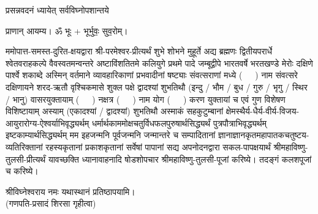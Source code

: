 
\setlength{\parindent}{0pt}




{प्रसन्नवदनं ध्यायेत् सर्वविघ्नोपशान्तये}
 
प्राणान्  आयम्य।  ॐ भूः + भूर्भुवः॒ सुव॒रोम्।


ममोपात्त-समस्त-दुरित-क्षयद्वारा श्री-परमेश्वर-प्रीत्यर्थं शुभे शोभने मुहूर्ते अद्य ब्रह्मणः
द्वितीयपरार्धे श्वेतवराहकल्पे वैवस्वतमन्वन्तरे अष्टाविंशतितमे कलियुगे प्रथमे पादे
जम्बूद्वीपे भारतवर्षे भरतखण्डे मेरोः दक्षिणे पार्श्वे शकाब्दे अस्मिन् वर्तमाने व्यावहारिकाणां प्रभवादीनां षष्ट्याः संवत्सराणां मध्ये \mbox{(~~~)} नाम संवत्सरे दक्षिणायने
शरद-ऋतौ  वृश्चिकमासे शुक्ल पक्षे द्वादश्यां शुभतिथौ
(इन्दु / भौम / बुध / गुरु / भृगु / स्थिर / भानु) वासरयुक्तायाम्
\mbox{(~~~)} नक्षत्र \mbox{(~~~)} नाम  योग  \mbox{(~~~)} करण युक्तायां च एवं गुण विशेषण विशिष्टायाम्
अस्याम् (एकादश्यां / द्वादश्यां) शुभतिथौ
अस्माकं सहकुटुम्बानां क्षेमस्थैर्य-धैर्य-वीर्य-विजय-आयुरारोग्य-ऐश्वर्याभिवृद्ध्यर्थम्
 धर्मार्थकाममोक्ष\-चतुर्विधफलपुरुषार्थसिद्ध्यर्थं पुत्रपौत्राभि\-वृद्ध्यर्थम् इष्टकाम्यार्थसिद्ध्यर्थम्
मम इहजन्मनि पूर्वजन्मनि जन्मान्तरे च सम्पादितानां ज्ञानाज्ञानकृतमहा\-पातकचतुष्टय-व्यतिरिक्तानां रहस्यकृतानां प्रकाशकृतानां सर्वेषां पापानां सद्य अपनोदनद्वारा सकल-पापक्षयार्थं श्रीमहाविष्णु-तुलसी-प्रीत्यर्थं यावच्छक्ति ध्यानावाहनादि
षोडशोपचार श्रीमहाविष्णु-तुलसी-पूजां करिष्ये। तदङ्गं कलशपूजां च करिष्ये।


श्रीविघ्नेश्वराय नमः यथास्थानं प्रतिष्ठापयामि।\\
(गणपति-प्रसादं शिरसा गृहीत्वा)













